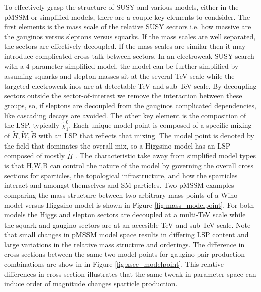 To effectively grasp the structure of SUSY and various models, either in the pMSSM or simplified models, there are a couple key elements to condsider. The first elements is the mass scale of the relative SUSY sectors i.e. how massive are the gauginos versus sleptons versus squarks. If the mass scales are well separated, the sectors are effectively decoupled. If the mass scales are similar then it may introduce complicated cross-talk between sectors. In an electroweak SUSY search with a 4 parameter simplified model, the model can be further simplified by assuming squarks and slepton masses sit at the several TeV scale while the targeted electroweak-inos are at detectable  TeV and sub-TeV scale.  By decoupling sectors outside the sector-of-interest we remove the interaction between these groups, so, if sleptons are decoupled from the gauginos complicated dependencies, like cascading decays are avoided. The other key element is the composition of the LSP, typically $\tilde{\chi}^0_1$. Each unique model point is composed of a specific mixing of $\tilde{H},\tilde{W},\tilde{B}$ with an LSP that reflects that mixing. The model point is denoted by the field that dominates the overall mix, so a Higgsino model has an LSP composed of mostly $\tilde{H}$ \cite{ATLAS:2015wrn}. The characteristic take away from simplified model types is that H,W,B  can control the nature of the model by governing the overall cross sections for sparticles, the topological infrastructure, and how the sparticles interact and amongst themselves and SM particles. Two pMSSM examples comparing the mass structure between two arbitrary mass points of a Wino model versus Higgsino model is shown in Figure \ref{fig:mass_modelpoint}. For both models the Higgs and slepton sectors are decoupled at a multi-TeV scale while the squark and gaugino sectors are at an accesible TeV and sub-TeV scale. Note that small changes in pMSSM model space results in differing LSP content and large variations in the relative mass structure and orderings. The difference in cross sections between the same two model points for gaugino pair production combinations are show in in Figure \ref{fig:xsec_modelpoint}. This relative differences in cross section illustrates that the same tweak in parameter space can induce order of magnitude changes sparticle production.





